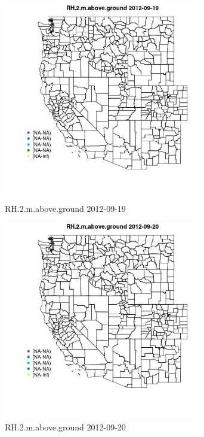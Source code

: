 \begin{figure} 
\centering  
\includegraphics[width=0.77\textwidth]{Code_Outputs/ML_input_report_ML_input_PM25_Step5_part_d_de_duplicated_aves_ML_input_MapObsRH2maboveground2012-09-19.jpg} 
\caption{\label{fig:ML_input_report_ML_input_PM25_Step5_part_d_de_duplicated_aves_ML_inputMapObsRH2maboveground2012-09-19}RH.2.m.above.ground 2012-09-19} 
\end{figure} 
 

\begin{figure} 
\centering  
\includegraphics[width=0.77\textwidth]{Code_Outputs/ML_input_report_ML_input_PM25_Step5_part_d_de_duplicated_aves_ML_input_MapObsRH2maboveground2012-09-20.jpg} 
\caption{\label{fig:ML_input_report_ML_input_PM25_Step5_part_d_de_duplicated_aves_ML_inputMapObsRH2maboveground2012-09-20}RH.2.m.above.ground 2012-09-20} 
\end{figure} 
 


